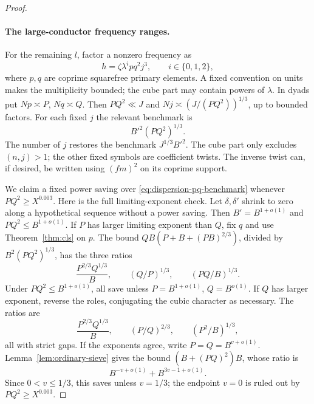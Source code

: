 \begin{proof}
\paragraph{The large-conductor frequency ranges.}
For the remaining $l$, factor a nonzero frequency as
\[
 h=\zeta\lambda^i p q^2 j^3,\qquad i\in\{0,1,2\},
\]
where $p,q$ are coprime squarefree primary elements. A fixed convention
on units makes the multiplicity bounded; the cube part may contain
powers of $\lambda$. In dyads put $Np\asymp P$, $Nq\asymp Q$.
Then $PQ^2\ll J$ and $Nj\asymp(J/(PQ^2))^{1/3}$, up to bounded
factors. For each fixed $j$ the relevant benchmark is
\begin{equation}
 B'^2(PQ^2)^{1/3}.
 \label{eq:dispersion-pq-benchmark}
\end{equation}
The number of $j$ restores the benchmark $J^{1/3}B'^2$. The cube part
only excludes $(n,j)>1$; the other fixed symbols are coefficient
twists. The inverse twist can, if desired, be written using $(fm)^2$
on its coprime support.

We claim a fixed power saving over
\eqref{eq:dispersion-pq-benchmark} whenever $PQ^2\ge X^{0.003}$.
Here is the full limiting-exponent check. Let $\delta,\delta'$ shrink
to zero along a hypothetical sequence without a power saving. Then
$B'=B^{1+o(1)}$ and $PQ^2\le B^{1+o(1)}$. If $P$ has larger limiting
exponent than $Q$, fix $q$ and use Theorem~\ref{thm:cls} on $p$.
The bound $QB(P+B+(PB)^{2/3})$, divided by
$B^2(PQ^2)^{1/3}$, has the three ratios
\begin{equation}
 \frac{P^{2/3}Q^{1/3}}B,\qquad
 (Q/P)^{1/3},\qquad (PQ/B)^{1/3}.
 \label{eq:dispersion-p-dominant}
\end{equation}
Under $PQ^2\le B^{1+o(1)}$, all save unless
$P=B^{1+o(1)}$, $Q=B^{o(1)}$. If $Q$ has larger exponent, reverse
the roles, conjugating the cubic character as necessary. The ratios are
\begin{equation}
 \frac{P^{2/3}Q^{1/3}}B,\qquad
 (P/Q)^{2/3},\qquad (P^2/B)^{1/3},
 \label{eq:dispersion-q-dominant}
\end{equation}
all with strict gaps. If the exponents agree, write
$P=Q=B^{v+o(1)}$. Lemma~\ref{lem:ordinary-sieve} gives the bound
$(B+(PQ)^2)B$, whose ratio is
\[
 B^{-v+o(1)}+B^{3v-1+o(1)}.
\]
Since $0<v\le1/3$, this saves unless $v=1/3$; the endpoint $v=0$
is ruled out by $PQ^2\ge X^{0.003}$.


\end{proof}

